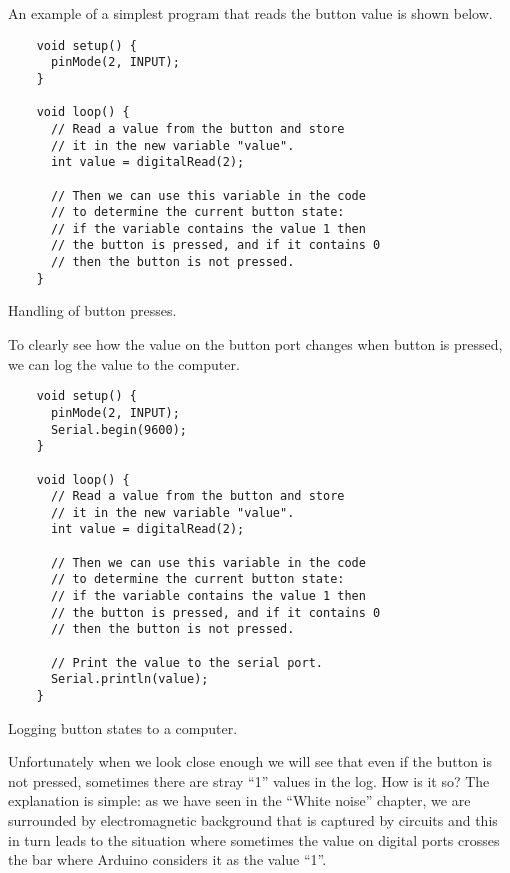 \documentclass[../sparc.tex]{subfiles}
\begin{document}

An example of a simplest program that reads the button value is shown below.

\begin{listing}[H]
  \begin{verbatim}
    void setup() {
      pinMode(2, INPUT);
    }

    void loop() {
      // Read a value from the button and store
      // it in the new variable "value".
      int value = digitalRead(2);

      // Then we can use this variable in the code
      // to determine the current button state:
      // if the variable contains the value 1 then
      // the button is pressed, and if it contains 0
      // then the button is not pressed.
    }
  \end{verbatim}
  \caption{Handling of button presses.}
  \label{listing:button-00}
\end{listing}

To clearly see how the value on the button port changes when button is pressed,
we can log the value to the computer.

\begin{listing}[H]
  \begin{verbatim}
    void setup() {
      pinMode(2, INPUT);
      Serial.begin(9600);
    }

    void loop() {
      // Read a value from the button and store
      // it in the new variable "value".
      int value = digitalRead(2);

      // Then we can use this variable in the code
      // to determine the current button state:
      // if the variable contains the value 1 then
      // the button is pressed, and if it contains 0
      // then the button is not pressed.

      // Print the value to the serial port.
      Serial.println(value);
    }
  \end{verbatim}
  \caption{Logging button states to a computer.}
  \label{listing:button-01}
\end{listing}

Unfortunately when we look close enough we will see that even if the button is
not pressed, sometimes there are stray ``1'' values in the log.  How is it so?
The explanation is simple: as we have seen in the ``White noise'' chapter, we
are surrounded by electromagnetic background that is captured by circuits and
this in turn leads to the situation where sometimes the value on digital ports
crosses the bar where Arduino considers it as the value ``1''.
\end{document}
